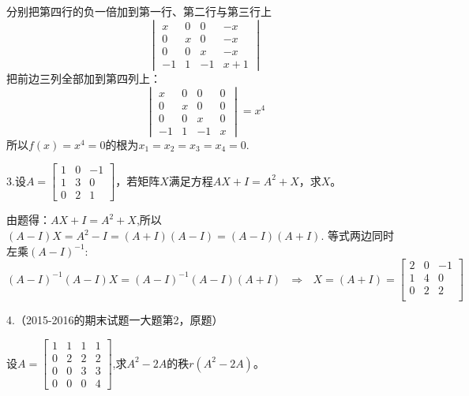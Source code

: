 \documentclass{article}
\begin{document}
\begin{jie}
分别把第四行的负一倍加到第一行、第二行与第三行上
\begin{equation*}
\begin{vmatrix}
  x & 0 & 0 & -x \\
  0 & x & 0& -x \\
  0 & 0 & x& -x\\
   -1 & 1 &-1 &x+1
\end{vmatrix}
\end{equation*}
把前边三列全部加到第四列上：
\begin{equation*}
\begin{vmatrix}
  x & 0 & 0 & 0 \\
  0 & x & 0& 0 \\
  0 & 0 & x& 0\\
   -1 & 1 &-1 &x
\end{vmatrix}=x^{4}
\end{equation*}
所以$f(x)=x^{4}=0$的根为$x_{1}=x_{2}=x_{3}=x_{4}=0$.
\end{jie}

3.设$
A=
\begin{bmatrix}
  1& 0 &-1 \\
  1&3&0\\
  0&2&1
\end{bmatrix}
$，若矩阵$X$满足方程$AX+I=A^{2}+X$，求$X$。

\begin{jie}
由题得：$AX+I=A^{2}+X$,所以$(A-I)X=A^{2}-I=(A+I)(A-I)=(A-I)(A+I)$.
等式两边同时左乘$(A-I)^{-1}$:
\begin{equation*}
 (A-I)^{-1}(A-I)X=(A-I)^{-1}(A-I)(A+I) ~~~\Rightarrow~~~X=(A+I)= \begin{bmatrix}
       2&0&-1\\
  1&4&0\\
  0&2&2\\
    \end{bmatrix}
\end{equation*}
\end{jie}

4.（2015-2016的期末试题一大题第2，原题）

设$
A=\begin{bmatrix}
    1 & 1 & 1 & 1\\
    0 & 2 & 2 & 2\\
    0 & 0 & 3 & 3\\
    0 & 0 & 0 & 4
  \end{bmatrix}
$,求$A^{2}-2A$的秩$r(A^{2}-2A)$。
\end{document}
